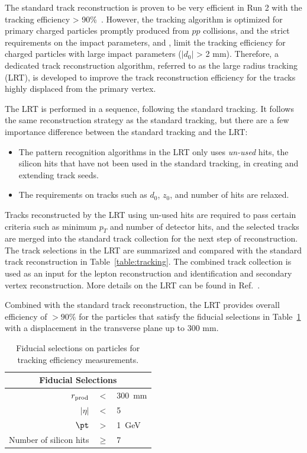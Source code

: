 The standard track reconstruction is proven to be very efficient in Run 2 with the tracking efficiency > 90\%~\cite{Aaboud:2017all}. However, the tracking algorithm is optimized for primary charged particles promptly produced from $pp$ collisions, and the strict requirements on the impact parameters, \dzero and \zzero, limit the tracking efficiency for charged particles with large impact parameters ($|d_{0}|$ > 2 mm). Therefore, a dedicated track reconstruction algorithm, referred to as the large radius tracking (LRT), is developed to improve the track reconstruction efficiency for the tracks highly displaced from the primary vertex.

The LRT is performed in a sequence, following the standard tracking. It follows the same reconstruction strategy as the standard tracking, but there are a few importance difference between the standard tracking and the LRT:

\begin{itemize}
	\item The pattern recognition algorithms in the LRT only uses \textit{un-used} hits, the silicon hits that have not been used in the standard tracking, in creating and extending track seeds.
	\item The requirements on tracks such as $d_{0}$, $z_{0}$, and number of hits are relaxed.
\end{itemize}

Tracks reconstructed by the LRT using un-used hits are required to pass certain criteria such as minimum $p_{T}$ and number of detector hits, and the selected tracks are merged into the standard track collection for the next step of reconstruction. The track selections in the LRT are summarized and compared with the standard track reconstruction in Table~\ref{table:tracking}. The combined track collection is used as an input for the lepton reconstruction and identification and secondary vertex reconstruction. More details on the LRT can be found in Ref.~\cite{ATL-PHYS-PUB-2017-014}.

Combined with the standard track reconstruction, the LRT provides overall efficiency of $> 90\%$ for the particles that satisfy the fiducial selections in Table~\ref{table:TechEffTable} with a displacement in the transverse plane up to 300 \si{\milli\meter}.

\begin{table}[!htb]
\centering
\begin{tabular}{ r c l }
 \hline
 \hline
  \multicolumn{3}{c}{Fiducial Selections}  \\
 \hline
 $r_{\rm prod}$ & $<$ & 300~mm \\
$|\eta|$ & $<$ & 5 \\
 $\pt$ & $>$ & 1~GeV  \\
 Number of silicon hits & $\ge$ & 7  \\
\hline
\hline
\end{tabular}
\caption{Fiducial selections on particles for tracking efficiency measurements.}
\label{table:TechEffTable}
\end{table}


